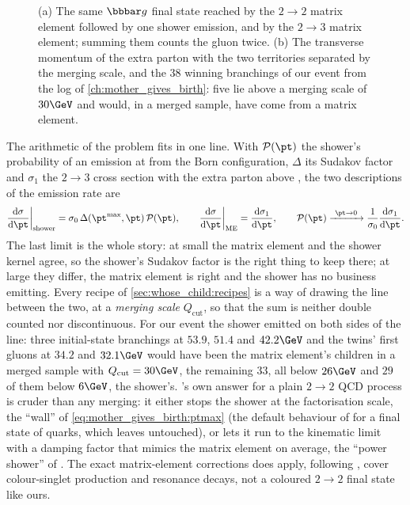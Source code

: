 \begin{figure}[htbp]\centering
\resizebox{\textwidth}{!}{}
\caption[The same gluon from two parents, and the merging scale against the branchings of our event]{(a) The same $\bbbar g$ final state reached by the $2\to2$ matrix element followed by one shower emission, and by the $2\to3$ matrix element; summing them counts the gluon twice. (b) The transverse momentum of the extra parton with the two territories separated by the merging scale, and the $38$ winning branchings of our event from the  log of \cref{ch:mother_gives_birth}: five lie above a merging scale of $30\GeV$ and would, in a merged sample, have come from a matrix element.}
\label{fig:whose_child:double_counting}
\end{figure}

The arithmetic of the problem fits in one line. With $\mathcal P(\pt)$ the
shower's probability of an emission at \pt from the Born configuration,
$\Delta$ its Sudakov factor and $\sigma_1$ the $2\to3$ cross section with the
extra parton above \pt, the two descriptions of the emission rate are
\begin{equation}
  \frac{\mathrm d\sigma}{\mathrm d\pt}\bigg|_{\mathrm{shower}}
   = \sigma_0\,\Delta(\pt^{\max},\pt)\,\mathcal P(\pt),
  \qquad
  \frac{\mathrm d\sigma}{\mathrm d\pt}\bigg|_{\mathrm{ME}}
   = \frac{\mathrm d\sigma_1}{\mathrm d\pt},
  \qquad
  \mathcal P(\pt)\xrightarrow{\ \pt\to0\ }\frac{1}{\sigma_0}\frac{\mathrm d\sigma_1}{\mathrm d\pt}.
  \label{eq:whose_child:two_rates}
\end{equation}
The last limit is the whole story: at small \pt the matrix element and the
shower kernel agree, so the shower's Sudakov factor is the right thing to
keep there; at large \pt they differ, the matrix element is right and the
shower has no business emitting. Every recipe of
\cref{sec:whose_child:recipes} is a way of drawing the line between the
two, at a \emph{merging scale} $Q_{\mathrm{cut}}$, so that the sum is
neither double counted nor discontinuous. For our event the shower emitted
on both sides of the line: three initial-state branchings at $53.9$, $51.4$
and $42.2\GeV$ and the twins' first gluons at $34.2$ and $32.1\GeV$ would
have been the matrix element's children in a merged sample with
$Q_{\mathrm{cut}}=30\GeV$, the remaining $33$, all below $26\GeV$ and
$29$ of them below $6\GeV$, the shower's. \PYTHIA's own answer for a plain
$2\to2$ QCD process is cruder than any merging: it either stops the shower
at the factorisation scale, the ``wall'' of \cref{eq:mother_gives_birth:ptmax}
(the default behaviour of  for a final state of quarks,
which \CMSSW leaves untouched), or lets it run to the kinematic
limit with a damping factor that mimics the matrix element on average, the
``power shower'' of \cite{Plehn:2005cq,Corke:2010zj}. The exact
matrix-element corrections \PYTHIA does apply, following
\cite{Miu:1998ju,Norrbin:2000uu}, cover colour-singlet production and
resonance decays, not a coloured $2\to2$ final state like ours.

